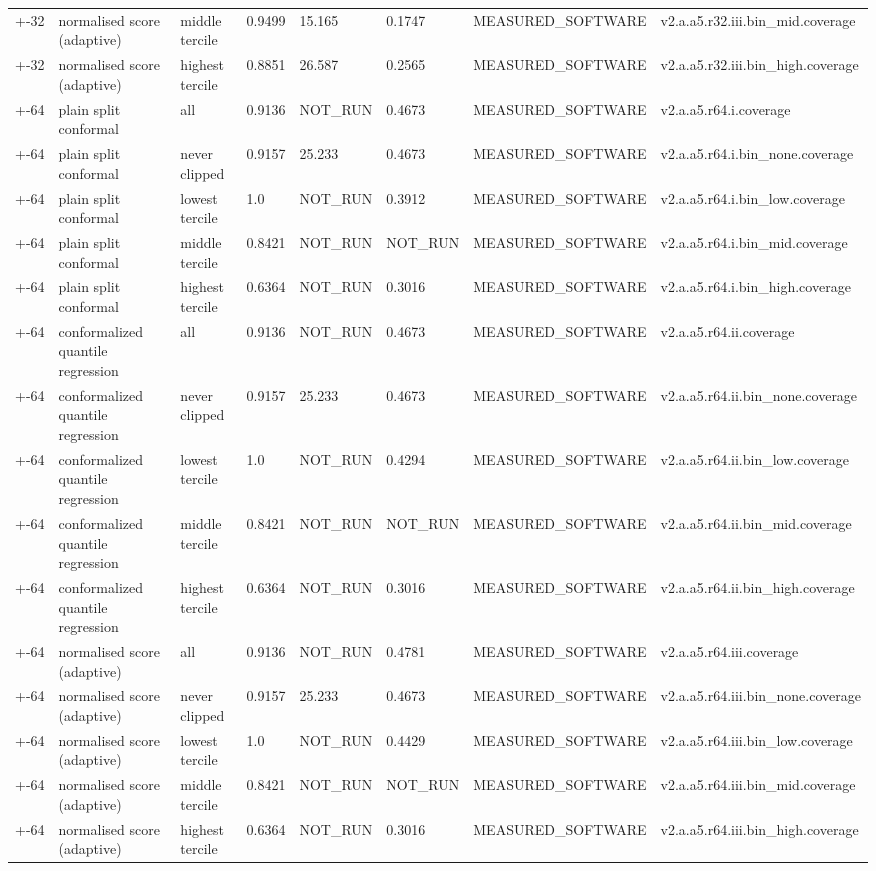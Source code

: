 \begin{table}[t]
\begin{tabular}{llllllll}
+-32 & normalised score (adaptive) & middle tercile & 0.9499 & 15.165 & 0.1747 & MEASURED\_SOFTWARE & v2.a.a5.r32.iii.bin\_mid.coverage \\
+-32 & normalised score (adaptive) & highest tercile & 0.8851 & 26.587 & 0.2565 & MEASURED\_SOFTWARE & v2.a.a5.r32.iii.bin\_high.coverage \\
+-64 & plain split conformal & all & 0.9136 & NOT\_RUN & 0.4673 & MEASURED\_SOFTWARE & v2.a.a5.r64.i.coverage \\
+-64 & plain split conformal & never clipped & 0.9157 & 25.233 & 0.4673 & MEASURED\_SOFTWARE & v2.a.a5.r64.i.bin\_none.coverage \\
+-64 & plain split conformal & lowest tercile & 1.0 & NOT\_RUN & 0.3912 & MEASURED\_SOFTWARE & v2.a.a5.r64.i.bin\_low.coverage \\
+-64 & plain split conformal & middle tercile & 0.8421 & NOT\_RUN & NOT\_RUN & MEASURED\_SOFTWARE & v2.a.a5.r64.i.bin\_mid.coverage \\
+-64 & plain split conformal & highest tercile & 0.6364 & NOT\_RUN & 0.3016 & MEASURED\_SOFTWARE & v2.a.a5.r64.i.bin\_high.coverage \\
+-64 & conformalized quantile regression & all & 0.9136 & NOT\_RUN & 0.4673 & MEASURED\_SOFTWARE & v2.a.a5.r64.ii.coverage \\
+-64 & conformalized quantile regression & never clipped & 0.9157 & 25.233 & 0.4673 & MEASURED\_SOFTWARE & v2.a.a5.r64.ii.bin\_none.coverage \\
+-64 & conformalized quantile regression & lowest tercile & 1.0 & NOT\_RUN & 0.4294 & MEASURED\_SOFTWARE & v2.a.a5.r64.ii.bin\_low.coverage \\
+-64 & conformalized quantile regression & middle tercile & 0.8421 & NOT\_RUN & NOT\_RUN & MEASURED\_SOFTWARE & v2.a.a5.r64.ii.bin\_mid.coverage \\
+-64 & conformalized quantile regression & highest tercile & 0.6364 & NOT\_RUN & 0.3016 & MEASURED\_SOFTWARE & v2.a.a5.r64.ii.bin\_high.coverage \\
+-64 & normalised score (adaptive) & all & 0.9136 & NOT\_RUN & 0.4781 & MEASURED\_SOFTWARE & v2.a.a5.r64.iii.coverage \\
+-64 & normalised score (adaptive) & never clipped & 0.9157 & 25.233 & 0.4673 & MEASURED\_SOFTWARE & v2.a.a5.r64.iii.bin\_none.coverage \\
+-64 & normalised score (adaptive) & lowest tercile & 1.0 & NOT\_RUN & 0.4429 & MEASURED\_SOFTWARE & v2.a.a5.r64.iii.bin\_low.coverage \\
+-64 & normalised score (adaptive) & middle tercile & 0.8421 & NOT\_RUN & NOT\_RUN & MEASURED\_SOFTWARE & v2.a.a5.r64.iii.bin\_mid.coverage \\
+-64 & normalised score (adaptive) & highest tercile & 0.6364 & NOT\_RUN & 0.3016 & MEASURED\_SOFTWARE & v2.a.a5.r64.iii.bin\_high.coverage \\
\bottomrule
\end{tabular}
\end{table}
